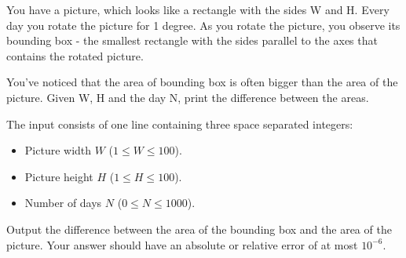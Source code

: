 \problemname{\problemyamlname}


\newcommand{\mina}{1}
\newcommand{\maxa}{100}
\newcommand{\minn}{0}
\newcommand{\maxn}{1000}

You have a picture, which looks like a rectangle with the sides W and H. Every day you rotate the picture for 1 degree. As you rotate the picture, you observe its bounding box - the smallest rectangle with the sides parallel to the axes that contains the rotated picture. 

You've noticed that the area of bounding box is often bigger than the area of the picture. Given W, H and the day N, print the difference between the areas.

\begin{Input}
    The input consists of one line containing three space separated integers:
    \begin{itemize}
        \item Picture width $W$ ($\mina \leq W\leq \maxa$).
        \item Picture height $H$ ($\mina \leq H\leq \maxa$).
        \item Number of days $N$ ($\minn \leq N\leq \maxn$).
    \end{itemize}
\end{Input}

\begin{Output}
    Output the difference between the area of the bounding box and the area of the picture.
    Your answer should have an absolute or relative error of at most $10^{-6}$.
\end{Output}
